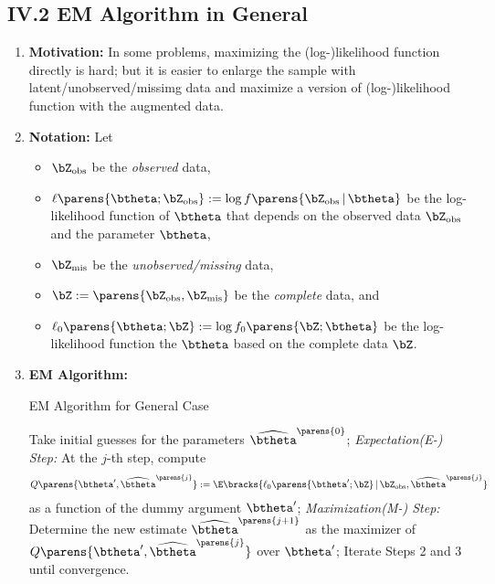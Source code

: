\documentclass[12pt]{article}
\begin{document}
\subsection*{IV.2 EM Algorithm in General}

\begin{enumerate}[label=\textbf{\arabic*.}]

	\item \textbf{Motivation:} In some problems, maximizing the (log-)likelihood function directly is hard; but it is easier to enlarge the sample with latent/unobserved/missimg data and maximize a version of (log-)likelihood function with the augmented data. 
	
	\item \textbf{Notation:} Let 
	\begin{itemize}
		\item $\bZ_{\mathrm{obs}}$ be the \textit{observed} data, 
		\item $\ell \parens{\btheta; \bZ_{\mathrm{obs}}} := \log f \parens{\bZ_{\mathrm{obs}} \,\vert\, \btheta}$ be the log-likelihood function of $\btheta$ that depends on the observed data $\bZ_{\mathrm{obs}}$ and the parameter $\btheta$, 
		\item $\bZ_{\mathrm{mis}}$ be the \textit{unobserved/missing} data, 
		\item $\bZ := \parens{\bZ_{\mathrm{obs}}, \bZ_{\mathrm{mis}}}$ be the \textit{complete} data, and 
		\item $\ell_0 \parens{\btheta; \bZ} := \log f_0 \parens{\bZ; \btheta}$ be the log-likelihood function the $\btheta$ based on the complete data $\bZ$. 
	\end{itemize}
	
	\item \textbf{EM Algorithm:} 
	
	\begin{minipage}{\linewidth}
		\begin{algorithm}[H]
			\caption{EM Algorithm for General Case}\label{algo-em-general}
			\begin{algorithmic}[1]
				\STATE Take initial guesses for the parameters $\widehat{\btheta}^{\parens{0}}$; 
				\STATE \textit{Expectation(E-) Step:} At the $j$-th step,  compute 
				\begin{align*}
					Q \parens{\btheta', \widehat{\btheta}^{\parens{j}}} := \E \bracks{\ell_0 \parens{\btheta'; \bZ} \,\vert\, \bZ_{\mathrm{obs}}, \widehat{\btheta}^{\parens{j}}}
				\end{align*}
				as a function of the dummy argument $\btheta'$; 
				\STATE \textit{Maximization(M-) Step:} Determine the new estimate $\widehat{\btheta}^{\parens{j+1}}$ as the maximizer of $Q \parens{\btheta', \widehat{\btheta}^{\parens{j}}}$ over $\btheta'$; 
				\STATE Iterate Steps 2 and 3 until convergence. 
			\end{algorithmic}
		\end{algorithm}
	\end{minipage}
	

\end{enumerate}
\end{document}
